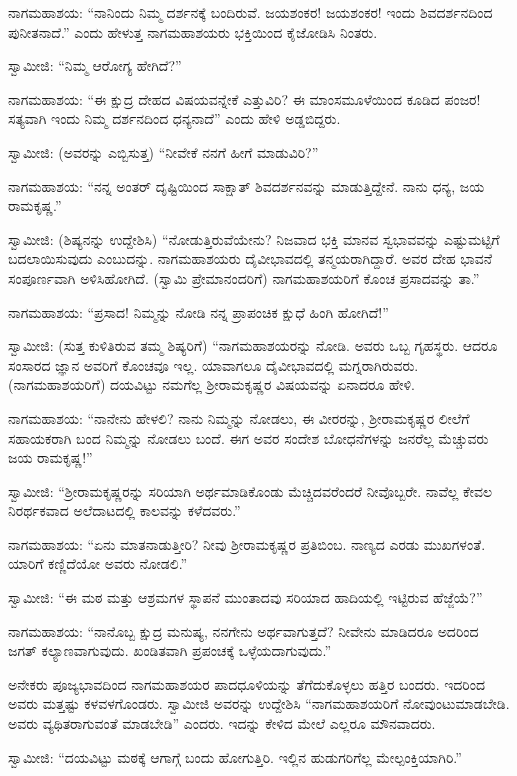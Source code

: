  ನಾಗಮಹಾಶಯ: “ನಾನಿಂದು ನಿಮ್ಮ ದರ್ಶನಕ್ಕೆ ಬಂದಿರುವೆ. ಜಯಶಂಕರ! ಜಯಶಂಕರ! ಇಂದು ಶಿವದರ್ಶನದಿಂದ ಪುನೀತನಾದೆ.” ಎಂದು ಹೇಳುತ್ತ ನಾಗಮಹಾಶಯರು ಭಕ್ತಿಯಿಂದ ಕೈಜೋಡಿಸಿ ನಿಂತರು. 

 ಸ್ವಾಮೀಜಿ: “ನಿಮ್ಮ ಆರೋಗ್ಯ ಹೇಗಿದೆ?” 

 ನಾಗಮಹಾಶಯ: “ಈ ಕ್ಷುದ್ರ ದೇಹದ ವಿಷಯವನ್ನೇಕೆ ಎತ್ತುವಿರಿ? ಈ ಮಾಂಸಮೂಳೆಯಿಂದ ಕೂಡಿದ ಪಂಜರ! ಸತ್ಯವಾಗಿ ಇಂದು ನಿಮ್ಮ ದರ್ಶನದಿಂದ ಧನ್ಯನಾದೆ” ಎಂದು ಹೇಳಿ ಅಡ್ಡಬಿದ್ದರು. 

 ಸ್ವಾಮೀಜಿ: (ಅವರನ್ನು ಎಬ್ಬಿಸುತ್ತ) “ನೀವೇಕೆ ನನಗೆ ಹೀಗೆ ಮಾಡುವಿರಿ?” 

 ನಾಗಮಹಾಶಯ: “ನನ್ನ ಅಂತರ್ ದೃಷ್ಟಿಯಿಂದ ಸಾಕ್ಷಾತ್ ಶಿವದರ್ಶನವನ್ನು ಮಾಡುತ್ತಿದ್ದೇನೆ. ನಾನು ಧನ್ಯ, ಜಯ ರಾಮಕೃಷ್ಣ.” 

 ಸ್ವಾಮೀಜಿ: (ಶಿಷ್ಯನನ್ನು ಉದ್ದೇಶಿಸಿ) “ನೋಡುತ್ತಿರುವೆಯೇನು? ನಿಜವಾದ ಭಕ್ತಿ ಮಾನವ ಸ್ವಭಾವವನ್ನು ಎಷ್ಟುಮಟ್ಟಿಗೆ ಬದಲಾಯಿಸುವುದು ಎಂಬುದನ್ನು. ನಾಗಮಹಾಶಯರು ದೈವೀಭಾವದಲ್ಲಿ ತನ್ಮಯರಾಗಿದ್ದಾರೆ. ಅವರ ದೇಹ ಭಾವನೆ ಸಂಪೂರ್ಣವಾಗಿ ಅಳಿಸಿಹೋಗಿದೆ. (ಸ್ವಾಮಿ ಪ್ರೇಮಾನಂದರಿಗೆ) ನಾಗಮಹಾಶಯರಿಗೆ ಕೊಂಚ ಪ್ರಸಾದವನ್ನು ತಾ.” 

 ನಾಗಮಹಾಶಯ: “ಪ್ರಸಾದ! ನಿಮ್ಮನ್ನು ನೋಡಿ ನನ್ನ ಪ್ರಾಪಂಚಿಕ ಕ್ಷುಧೆ ಹಿಂಗಿ ಹೋಗಿದೆ!” 

 ಸ್ವಾಮೀಜಿ: (ಸುತ್ತ ಕುಳಿತಿರುವ ತಮ್ಮ ಶಿಷ್ಯರಿಗೆ) “ನಾಗಮಹಾಶಯರನ್ನು ನೋಡಿ. ಅವರು ಒಬ್ಬ ಗೃಹಸ್ಥರು. ಆದರೂ ಸಂಸಾರದ ಜ್ಞಾನ ಅವರಿಗೆ ಕೊಂಚವೂ ಇಲ್ಲ. ಯಾವಾಗಲೂ ದೈವೀಭಾವದಲ್ಲಿ ಮಗ್ನರಾಗಿರುವರು. (ನಾಗಮಹಾಶಯರಿಗೆ) ದಯವಿಟ್ಟು ನಮಗೆಲ್ಲ ಶ‍್ರೀರಾಮಕೃಷ್ಣರ ವಿಷಯವನ್ನು ಏನಾದರೂ ಹೇಳಿ. 

 ನಾಗಮಹಾಶಯ: “ನಾನೇನು ಹೇಳಲಿ? ನಾನು ನಿಮ್ಮನ್ನು ನೋಡಲು, ಈ ವೀರರನ್ನು, ಶ‍್ರೀರಾಮಕೃಷ್ಣರ ಲೀಲೆಗೆ ಸಹಾಯಕರಾಗಿ ಬಂದ ನಿಮ್ಮನ್ನು ನೋಡಲು ಬಂದೆ. ಈಗ ಅವರ ಸಂದೇಶ ಬೋಧನೆಗಳನ್ನು ಜನರೆಲ್ಲ ಮೆಚ್ಚುವರು ಜಯ ರಾಮಕೃಷ್ಣ!” 

 ಸ್ವಾಮೀಜಿ: “ಶ‍್ರೀರಾಮಕೃಷ್ಣರನ್ನು ಸರಿಯಾಗಿ ಅರ್ಥಮಾಡಿಕೊಂಡು ಮೆಚ್ಚಿದವರೆಂದರೆ ನೀವೊಬ್ಬರೇ. ನಾವೆಲ್ಲ ಕೇವಲ ನಿರರ್ಥಕವಾದ ಅಲೆದಾಟದಲ್ಲಿ ಕಾಲವನ್ನು ಕಳೆದವರು.” 

 ನಾಗಮಹಾಶಯ: “ಏನು ಮಾತನಾಡುತ್ತೀರಿ? ನೀವು ಶ‍್ರೀರಾಮಕೃಷ್ಣರ ಪ್ರತಿಬಿಂಬ. ನಾಣ್ಯದ ಎರಡು ಮುಖಗಳಂತೆ. ಯಾರಿಗೆ ಕಣ್ಣಿದೆಯೋ ಅವರು ನೋಡಲಿ.” 

 ಸ್ವಾಮೀಜಿ: “ಈ ಮಠ ಮತ್ತು ಆಶ್ರಮಗಳ ಸ್ಥಾಪನೆ ಮುಂತಾದವು ಸರಿಯಾದ ಹಾದಿಯಲ್ಲಿ ಇಟ್ಟಿರುವ ಹೆಜ್ಜೆಯೆ?” 

 ನಾಗಮಹಾಶಯ: “ನಾನೊಬ್ಬ ಕ್ಷುದ್ರ ಮನುಷ್ಯ, ನನಗೇನು ಅರ್ಥವಾಗುತ್ತದೆ? ನೀವೇನು ಮಾಡಿದರೂ ಅದರಿಂದ ಜಗತ್ ಕಲ್ಯಾಣವಾಗುವುದು. ಖಂಡಿತವಾಗಿ ಪ್ರಪಂಚಕ್ಕೆ ಒಳ್ಳೆಯದಾಗುವುದು.” 

 ಅನೇಕರು ಪೂಜ್ಯಭಾವದಿಂದ ನಾಗಮಹಾಶಯರ ಪಾದಧೂಳಿಯನ್ನು ತೆಗೆದುಕೊಳ್ಳಲು ಹತ್ತಿರ ಬಂದರು. ಇದರಿಂದ ಅವರು ಮತ್ತಷ್ಟು ಕಳವಳಗೊಂಡರು. ಸ್ವಾಮೀಜಿ ಅವರನ್ನು ಉದ್ದೇಶಿಸಿ “ನಾಗಮಹಾಶಯರಿಗೆ ನೋವುಂಟುಮಾಡಬೇಡಿ. ಅವರು ವ್ಯಥಿತರಾಗುವಂತೆ ಮಾಡಬೇಡಿ” ಎಂದರು. ಇದನ್ನು ಕೇಳಿದ ಮೇಲೆ ಎಲ್ಲರೂ ಮೌನವಾದರು. 

 ಸ್ವಾಮೀಜಿ: “ದಯವಿಟ್ಟು ಮಠಕ್ಕೆ ಆಗಾಗ್ಗೆ ಬಂದು ಹೋಗುತ್ತಿರಿ. ಇಲ್ಲಿನ ಹುಡುಗರಿಗೆಲ್ಲ ಮೇಲ್ಪಂಕ್ತಿಯಾಗಿರಿ.” 

